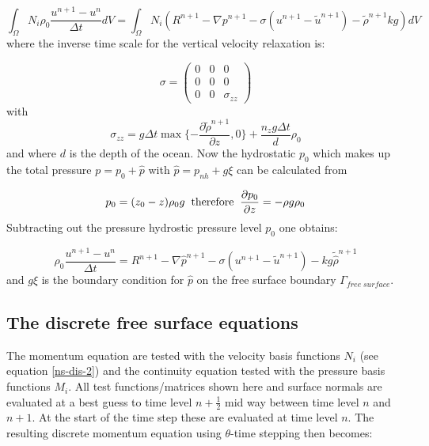 \begin{equation}
\int_\Omega N_i \rho_0 \frac{u^{n+1}- u^n}{\Delta t} d V=
\int_\Omega N_i (R^{n+1} - \nabla p^{n+1}
- \sigma (u^{n+1}-\tilde
u^{n+1})
- {\tilde \rho}^{n+1} k g ) dV
\label{ns-dis-2}
\end{equation}
where the inverse time scale for the vertical velocity
relaxation is:

\begin{equation}
\sigma=
  \begin{pmatrix}
    0   & 0 & 0 \\
    0   & 0 & 0 \\
    0 & 0 & \sigma_{zz}
  \end{pmatrix}
\label{sigma_matrix}
\end{equation}
with
\begin{equation}
\sigma_{zz}= g \Delta t \max\{-\frac{\partial {\tilde \rho}^{n+1}}{\partial z},
0\}
+ \frac{n_z g \Delta t}{d} \rho_0
\label{sigma_z}
\end{equation}
and where $d$ is the depth of the ocean.
Now the hydrostatic $p_0$ which makes up the total
pressure $p=p_0+\hat p $ with $\hat p = p_{nh} + g\xi$
can be calculated from

\begin{equation}
p_0=(z_0-z)\rho_0 g \;\;{\rm therefore}\;\;
\frac{\partial p_0}{\partial z}= -\rho g \rho_0
\label{p_h}
\end{equation}
Subtracting out the pressure hydrostic pressure level $p_0$ one obtains:

\begin{equation}
\rho_0 \frac{u^{n+1}- u^n}{\Delta t} =
R^{n+1} - \nabla \hat p^{n+1}
- \sigma (u^{n+1}-\tilde u^{n+1}) - kg{\tilde{\hat\rho}}^{n+1}
\label{ns-dis-3}
\end{equation}
and $g \xi$ is the boundary condition for $\hat p$ on the free
surface boundary $\Gamma_{free\; surface}$.





\subsection{The discrete free surface equations}
\noindent The momentum equation are tested with the velocity
basis functions $N_i$ (see equation \ref{ns-dis-2}) and the continuity equation tested
with the pressure basis functions $M_i$. All test functions/matrices
shown here and surface normals are evaluated at a best guess to
time level $n+\frac{1}{2}$ mid way
between time level $n$ and $n+1$. At the start of the time
step these are evaluated at time level $n$.
The resulting discrete momentum equation using $\theta$-time stepping then becomes:

